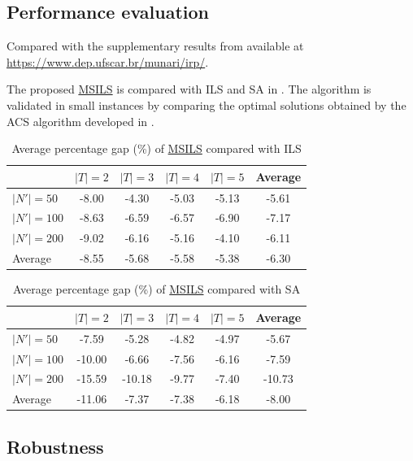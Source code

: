 \documentclass{article}
\begin{document}
\subsection{Performance evaluation}\label{sec:performance evaluation}


Compared with the supplementary results from \cite{alvarez2018iterated} available at \url{https://www.dep.ufscar.br/munari/irp/}. 


The proposed \hyperref[alg:MSILS]{MSILS} is compared with ILS and SA in \cite{alvarez2018iterated}. The algorithm is validated in small instances by comparing the optimal solutions obtained by the ACS algorithm developed in \cite{archetti2019exact}.
\begin{table}[htbp] 
\centering 
\caption{Average percentage gap (\%) of \hyperref[alg:MSILS]{MSILS} compared with ILS} \label{tab:msils_vs_ils} 
\begin{tabular}{lccccc} 
\toprule & $|T|=2$ & $|T|=3$ & $|T|=4$ & $|T|=5$ & Average \\ 
\midrule 
$|N'|=50$ & -8.00 & -4.30 & -5.03 & -5.13 & -5.61 \\ 
$|N'|=100$ & -8.63 & -6.59 & -6.57 & -6.90 & -7.17 \\ 
$|N'|=200$ & -9.02 & -6.16 & -5.16 & -4.10 & -6.11 \\ 
\midrule 
Average & -8.55 & -5.68 & -5.58 & -5.38 & -6.30 \\ 
\bottomrule 
\end{tabular} 
\end{table}


\begin{table}[htbp] 
\centering 
\caption{Average percentage gap (\%) of \hyperref[alg:MSILS]{MSILS} compared with SA} \label{tab:msils_vs_ils} 
\begin{tabular}{lccccc} 
\toprule & $|T|=2$ & $|T|=3$ & $|T|=4$ & $|T|=5$ & Average \\ 
\midrule 
$|N'|=50$ & -7.59 & -5.28 & -4.82 & -4.97 & -5.67 \\ 
$|N'|=100$ & -10.00 & -6.66 & -7.56 & -6.16 & -7.59 \\ 
$|N'|=200$ & -15.59 & -10.18 & -9.77 & -7.40 & -10.73 \\ 
\midrule 
Average & -11.06 & -7.37 & -7.38 & -6.18 & -8.00 \\ 
\bottomrule 
\end{tabular} 
\end{table}


\subsection{Robustness} \label{Robustness}
\end{document}

